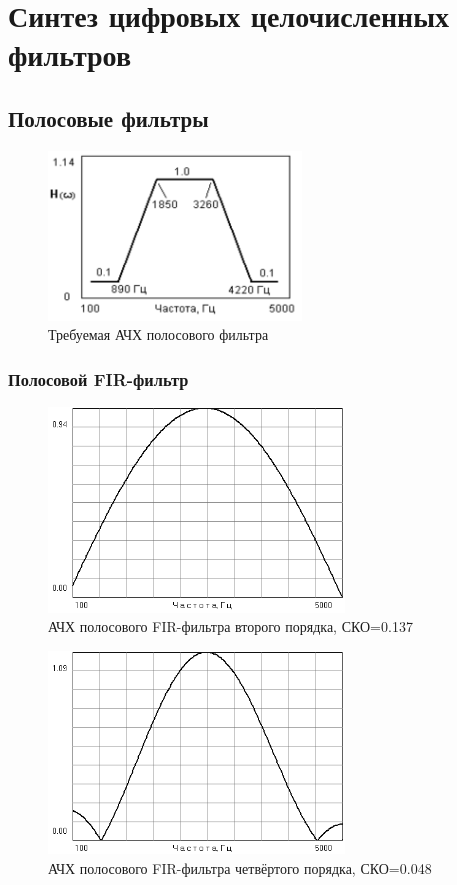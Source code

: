 \documentclass[a4paper,14pt]{extarticle}
\begin{document}
\section{Синтез цифровых целочисленных фильтров}
\subsection{Полосовые фильтры}
\begin{figure}[H]
  \centering
  \includegraphics[width=0.6\textwidth]{img/img6.png}
  \caption{Требуемая АЧХ полосового фильтра}
  \label{fig:}
\end{figure}
\subsubsection{Полосовой FIR-фильтр}
\begin{figure}[H]
  \centering
  \includegraphics[width=0.7\textwidth]{Z1_PPF/gain_FIR_2p.png}
  \caption{АЧХ полосового FIR-фильтра второго порядка, СКО=0.137}
  \label{fig:FIR_2p}
\end{figure}
\begin{figure}[H]
  \centering
  \includegraphics[width=0.7\textwidth]{Z1_PPF/gain_FIR_4p.png}
  \caption{АЧХ полосового FIR-фильтра четвёртого порядка, СКО=0.048}
  \label{fig:FIR_4p}
\end{figure}
\end{document}
